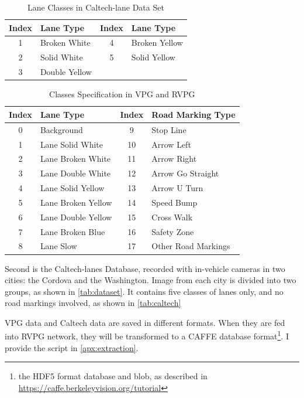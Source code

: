 \begin{spacing}{1.5}
\begin{table}[!ht]
\centering
\caption{Lane Classes in Caltech-lane Data Set}
\label{tab:caltech}
\begin{tabular}{@{}clcl@{}}
\toprule
Index & Lane Type & Index & Lane Type \\ \midrule
1 & Broken White & 4 & Broken Yellow \\
2 & Solid White & 5 & Solid Yellow \\
3 & Double Yellow & \multicolumn{1}{l}{} &  \\ \bottomrule
\end{tabular}
\end{table}


\begin{table}[ht]
\centering
\caption{Classes Specification in VPG and RVPG}
\label{tab:classes}
\begin{tabular}{clcl}
\toprule
Index & Lane Type          & Index & Road Marking Type   \\ \midrule
0     & Background         & 9     & Stop Line           \\
1     & Lane Solid White   & 10    & Arrow Left          \\
2     & Lane Broken White  & 11    & Arrow Right         \\
3     & Lane Double White  & 12    & Arrow Go Straight   \\
4     & Lane Solid Yellow  & 13    & Arrow U Turn        \\
5     & Lane Broken Yellow & 14    & Speed Bump          \\
6     & Lane Double Yellow & 15    & Cross Walk          \\
7     & Lane Broken Blue   & 16    & Safety Zone         \\
8     & Lane Slow          & 17    & Other Road Markings \\ \bottomrule
\end{tabular}
\end{table}%


Second is the Caltech-lanes Database, recorded with in-vehicle cameras in two cities: the Cordova and the Washington. Image from each city is divided into two groups, as shown in \autoref{tab:dataset}. It contains five classes of lanes only, and no road markings involved, as shown in \autoref{tab:caltech}

VPG data and Caltech data are saved in different formats. When they are fed into RVPG network, they will be transformed to a CAFFE database format\footnote{the HDF5 format database and blob, as described in \url{https://caffe.berkeleyvision.org/tutorial}}. I provide the script in \autoref{apx:extraction}.


\end{spacing}
